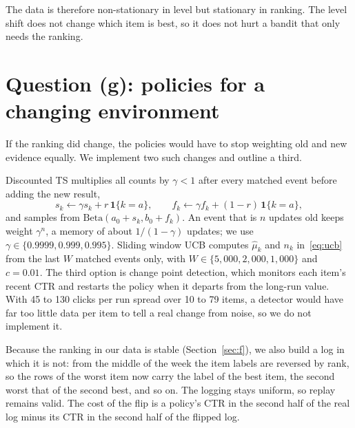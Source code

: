 \documentclass[11pt]{article}
\begin{document}
The data is therefore non-stationary in level but stationary in ranking. The
level shift does not change which item is best, so it does not hurt a bandit
that only needs the ranking.

\section{Question (g): policies for a changing environment}
\label{sec:g}

If the ranking did change, the policies would have to stop weighting old and
new evidence equally. We implement two such changes and outline a third.

Discounted TS \citep{raj2017} multiplies all counts by $\gamma<1$ after every
matched event before adding the new result,
%
\begin{equation}
  s_k \leftarrow \gamma s_k + r\,\mathbf{1}\{k=a\}, \qquad
  f_k \leftarrow \gamma f_k + (1-r)\,\mathbf{1}\{k=a\},
  \label{eq:dts}
\end{equation}
%
and samples from $\text{Beta}(a_0+s_k, b_0+f_k)$. An event that is $n$ updates
old keeps weight $\gamma^n$, a memory of about $1/(1-\gamma)$ updates; we use
$\gamma \in \{0.9999, 0.999, 0.995\}$. Sliding window UCB
\citep{garivier2011} computes $\hat\mu_k$ and $n_k$ in~\eqref{eq:ucb} from the
last $W$ matched events only, with $W \in \{5{,}000, 2{,}000, 1{,}000\}$ and
$c=0.01$. The third option is change point detection, which monitors each
item's recent CTR and restarts the policy when it departs from the long-run
value. With 45 to 130 clicks per run spread over 10 to 79 items, a detector
would have far too little data per item to tell a real change from noise, so
we do not implement it.

Because the ranking in our data is stable (Section~\ref{sec:f}), we also build
a log in which it is not: from the middle of the week the item labels are
reversed by rank, so the rows of the worst item now carry the label of the
best item, the second worst that of the second best, and so on. The logging
stays uniform, so replay remains valid. The cost of the flip is a policy's CTR
in the second half of the real log minus its CTR in the second half of the
flipped log.
\end{document}
